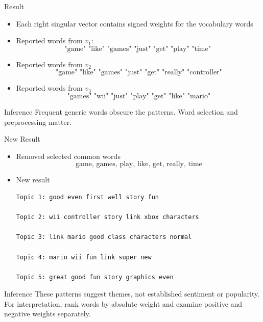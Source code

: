 \documentclass[10pt]{beamer}
\begin{document}
\begin{frame}{Result}
\begin{itemize}
    \item Each right singular vector contains signed weights for the vocabulary words

    \item Reported words from $v_1$:
    $$
    \text{
        "game"    "like"    "games"    "just"    "get"    "play"    "time"  
    }
    $$
    \item Reported words from $v_2$
    $$
    \text{"game"    "like"    "games"    "just"    "get"    "really"    "controller"}
    $$
    \item Reported words from $v_3$
    $$
    \text{"games"    "wii"    "just"    "play"    "get"    "like"    "mario"}
    $$
\end{itemize}
\begin{block}{Inference}
    Frequent generic words obscure the patterns. Word selection and preprocessing matter.
\end{block}
\end{frame}
\begin{frame}[fragile]{New Result}

\begin{itemize}
\item Removed selected common words 
$$
\text{game, games, play, like, get, really, time}
$$

\item New result 
\begin{lstlisting}
Topic 1: good even first well story fun 

Topic 2: wii controller story link xbox characters 

Topic 3: link mario good class characters normal 

Topic 4: mario wii fun link super new 

Topic 5: great good fun story graphics even 
\end{lstlisting}
\end{itemize}

\begin{block}{Inference}
These patterns suggest themes, not established sentiment or popularity. For interpretation, rank words by absolute weight and examine positive and negative weights separately.
\end{block}

\end{frame}
\end{document}
